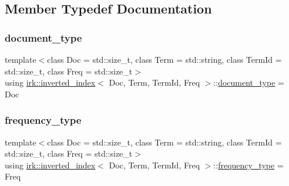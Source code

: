 \subsection{Member Typedef Documentation}
\mbox{\label{classirk_1_1inverted__index_ab708a9d1605de705341f3ed81bd7d5e7}} 
\subsubsection{\texorpdfstring{document\+\_\+type}{document\_type}}
{\footnotesize\ttfamily template$<$class Doc  = std\+::size\+\_\+t, class Term  = std\+::string, class Term\+Id  = std\+::size\+\_\+t, class Freq  = std\+::size\+\_\+t$>$ \\
using \mbox{\hyperlink{classirk_1_1inverted__index}{irk\+::inverted\+\_\+index}}$<$ Doc, Term, Term\+Id, Freq $>$\+::\mbox{\hyperlink{classirk_1_1inverted__index_ab708a9d1605de705341f3ed81bd7d5e7}{document\+\_\+type}} =  Doc}

\mbox{\label{classirk_1_1inverted__index_a549e531087ca14fc58742608cc8fe2e7}} 
\subsubsection{\texorpdfstring{frequency\+\_\+type}{frequency\_type}}
{\footnotesize\ttfamily template$<$class Doc  = std\+::size\+\_\+t, class Term  = std\+::string, class Term\+Id  = std\+::size\+\_\+t, class Freq  = std\+::size\+\_\+t$>$ \\
using \mbox{\hyperlink{classirk_1_1inverted__index}{irk\+::inverted\+\_\+index}}$<$ Doc, Term, Term\+Id, Freq $>$\+::\mbox{\hyperlink{classirk_1_1inverted__index_a549e531087ca14fc58742608cc8fe2e7}{frequency\+\_\+type}} =  Freq}

\mbox{\label{classirk_1_1inverted__index_aac7579f5261c795a6f19a7f700b57b2b}} 
